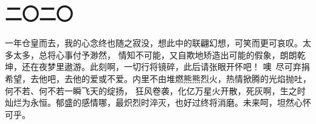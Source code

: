 \part{二〇二〇}

\begin{center}
\Huge{}
\end{center}

\vspace*{2\ccwd}

\hspace{2em} 一年仓皇而去，我的心念终也随之寂没，想此中的联翩幻想，可笑而更可哀叹。太多太多，总将心事付予渺然，
情知不可能，又自欺地矫造出可能的假象，朗朗乾坤，还在夜梦里遨游。此刻啊，一切行将镜碎，此后请张眼开怀吧！
噢~尽可弃捐希望，去他吧，去他的爱或不爱。内里不由堆燃熊熊烈火，热情掀腾的光焰抛吐，何不若、何不若一瞬飞天的绽扬，
狂风卷袭，化亿万星火开散，死灰啊，生之时灿烂为永恒。郁盛的感情哪，最炽烈时淬灭，也好过终将消磨。未来呵，坦然心怀可乎。

\newpage








